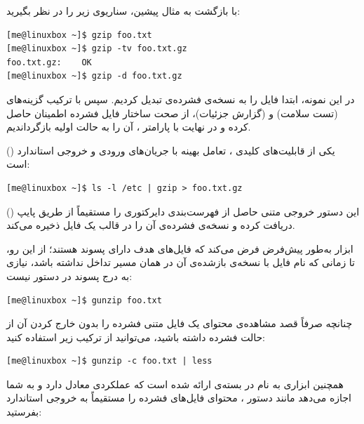 با بازگشت به مثال پیشین، سناریوی زیر را در نظر بگیرید:

\begin{latin}
\begin{lstlisting}
[me@linuxbox ~]$ gzip foo.txt
[me@linuxbox ~]$ gzip -tv foo.txt.gz
foo.txt.gz:    OK
[me@linuxbox ~]$ gzip -d foo.txt.gz
\end{lstlisting}
\end{latin}

در این نمونه، ابتدا فایل  را به نسخه‌ی فشرده‌ی  تبدیل کردیم. سپس با ترکیب گزینه‌های  (تست سلامت) و  (گزارش جزئیات)، از صحت ساختار فایل فشرده اطمینان حاصل کرده و در نهایت با پارامتر ، آن را به حالت اولیه بازگرداندیم.

یکی از قابلیت‌های کلیدی ، تعامل بهینه با جریان‌های ورودی و خروجی استاندارد () است:

\begin{latin}
\begin{lstlisting}
[me@linuxbox ~]$ ls -l /etc | gzip > foo.txt.gz
\end{lstlisting}
\end{latin}

این دستور خروجی متنی حاصل از فهرست‌بندی دایرکتوری را مستقیماً از طریق پایپ () دریافت کرده و نسخه‌ی فشرده‌ی آن را در قالب یک فایل ذخیره می‌کند.

ابزار  به‌طور پیش‌فرض فرض می‌کند که فایل‌های هدف دارای پسوند  هستند؛ از این رو، تا زمانی که نام فایل با نسخه‌ی بازشده‌ی آن در همان مسیر تداخل نداشته باشد، نیازی به درج پسوند در دستور نیست:

\begin{latin}
\begin{lstlisting}
[me@linuxbox ~]$ gunzip foo.txt
\end{lstlisting}
\end{latin}

چنانچه صرفاً قصد مشاهده‌ی محتوای یک فایل متنی فشرده را بدون خارج کردن آن از حالت فشرده داشته باشید، می‌توانید از ترکیب زیر استفاده کنید:

\begin{latin}
\begin{lstlisting}
[me@linuxbox ~]$ gunzip -c foo.txt | less
\end{lstlisting}
\end{latin}

همچنین ابزاری به نام  در بسته‌ی  ارائه شده است که عملکردی معادل  دارد و به شما اجازه می‌دهد مانند دستور ، محتوای فایل‌های فشرده را مستقیماً به خروجی استاندارد بفرستید:

